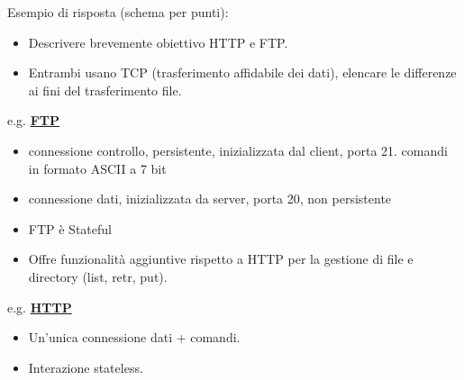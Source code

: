 \documentclass[11pt,a4paper]{article}
\theoremstyle{definition}
\begin{document}
\begin{enumerate}
	      Esempio di risposta (schema per punti):
	      \begin{itemize}
		      \item Descrivere brevemente obiettivo HTTP e FTP.
		      \item Entrambi usano TCP (trasferimento affidabile dei dati),  elencare le differenze ai fini del trasferimento file.
	      \end{itemize}
	      e.g.  \hyperref[sec:FTP]{\textbf{FTP}}
	      \begin{itemize}
		      \item connessione controllo, persistente, inizializzata dal client, porta 21. comandi in formato ASCII a 7 bit
		      \item connessione dati, inizializzata da server, porta 20, non persistente
		      \item  FTP è Stateful
		      \item Offre funzionalità aggiuntive rispetto a HTTP per la gestione di file e directory (list, retr, put).
	      \end{itemize}
	      e.g. \hyperref[sec:HTTP Protocol]{\textbf{HTTP}}
	      \begin{itemize}
		      \item Un'unica connessione dati + comandi.
		      \item Interazione stateless.
	      \end{itemize}
\end{enumerate}
\end{document}

